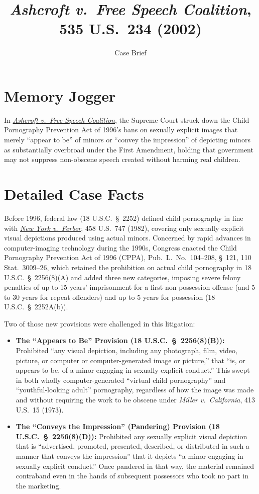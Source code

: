 \documentclass[12pt]{article}
\title{\textit{Ashcroft v.\ Free Speech Coalition}, 535 U.S.\ 234 (2002)}
\subtitle{Case Brief}
\author{}
\date{}
\begin{document}
\maketitle

\section{Memory Jogger}

In \href{https://supreme.justia.com/cases/federal/us/535/234/}{\textit{Ashcroft v.\ Free Speech Coalition}}, the Supreme Court struck down the Child Pornography Prevention Act of 1996's bans on sexually explicit images that merely ``appear to be'' of minors or ``convey the impression'' of depicting minors as substantially overbroad under the First Amendment, holding that government may not suppress non-obscene speech created without harming real children.

\section{Detailed Case Facts}

Before 1996, federal law (18 U.S.C.\ \S~2252) defined child pornography in line with \href{https://supreme.justia.com/cases/federal/us/458/747/}{\textit{New York v.\ Ferber}}, 458 U.S.\ 747 (1982), covering only sexually explicit visual depictions produced using actual minors. Concerned by rapid advances in computer-imaging technology during the 1990s, Congress enacted the Child Pornography Prevention Act of 1996 (CPPA), Pub.\ L.\ No.\ 104--208, \S~121, 110 Stat.\ 3009--26, which retained the prohibition on actual child pornography in 18 U.S.C.\ \S~2256(8)(A) and added three new categories, imposing severe felony penalties of up to 15 years' imprisonment for a first non-possession offense (and 5 to 30 years for repeat offenders) and up to 5 years for possession (18 U.S.C.\ \S~2252A(b)).

Two of those new provisions were challenged in this litigation:

\begin{itemize}
\item \textbf{The ``Appears to Be'' Provision (18 U.S.C.\ \S~2256(8)(B)):} Prohibited ``any visual depiction, including any photograph, film, video, picture, or computer or computer-generated image or picture,'' that ``is, or appears to be, of a minor engaging in sexually explicit conduct.'' This swept in both wholly computer-generated ``virtual child pornography'' and ``youthful-looking adult'' pornography, regardless of how the image was made and without requiring the work to be obscene under \textit{Miller v.\ California}, 413 U.S.\ 15 (1973).
\item \textbf{The ``Conveys the Impression'' (Pandering) Provision (18 U.S.C.\ \S~2256(8)(D)):} Prohibited any sexually explicit visual depiction that is ``advertised, promoted, presented, described, or distributed in such a manner that conveys the impression'' that it depicts ``a minor engaging in sexually explicit conduct.'' Once pandered in that way, the material remained contraband even in the hands of subsequent possessors who took no part in the marketing.
\end{itemize}
\end{document}
